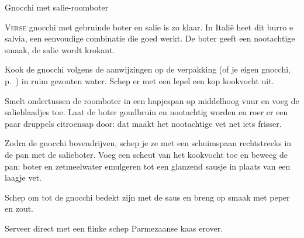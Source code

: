 \begin{recipe}{Gnocchi met salie-roomboter}
\label{recipe:gnocchi-salie-roomboter}


\lettrine{V}{erse} gnocchi met gebruinde boter en salie is zo klaar. In Italië
heet dit burro e salvia, een eenvoudige combinatie die goed werkt. De boter
geeft een nootachtige smaak, de salie wordt krokant.

\begin{ingredients}
\end{ingredients}

\begin{steps}
  \item Kook de gnocchi volgens de aanwijzingen op de verpakking (of je
        eigen gnocchi, p.~\pageref{recipe:gnocchi}) in ruim gezouten water.
        Schep er met een lepel een kop kookvocht uit.
  \item Smelt ondertussen de roomboter in een hapjespan op middelhoog vuur
        en voeg de salieblaadjes toe. Laat de boter goudbruin en nootachtig
        worden en roer er een paar druppels citroensap door: dat maakt het
        nootachtige vet net iets frisser.
  \item Zodra de gnocchi bovendrijven, schep je ze met een schuimspaan
        rechtstreeks in de pan met de salieboter. Voeg een scheut van het
        kookvocht toe en beweeg de pan: boter en zetmeelwater emulgeren tot
        een glanzend sausje in plaats van een laagje vet.
  \item Schep om tot de gnocchi bedekt zijn met de saus en breng op smaak
        met peper en zout.
  \item Serveer direct met een flinke schep Parmezaanse kaas erover.
\end{steps}
\end{recipe}
